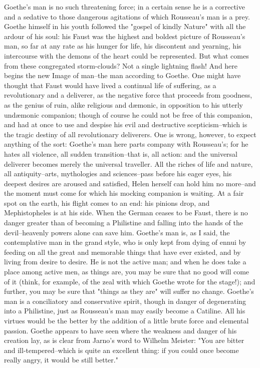 Goethe's man is no such threatening force; in a certain sense he is a
corrective and a sedative to those dangerous agitations of which
Rousseau's man is a prey. Goethe himself in his youth followed the
"gospel of kindly Nature" with all the ardour of his soul: his Faust
was the highest and boldest picture of Rousseau's man, so far at any
rate as his hunger for life, his discontent and yearning, his
intercourse with the demons of the heart could be represented. But
what comes from these congregated storm-clouds? Not a single
lightning flash! And here begins the new Image of man--the man
according to Goethe. One might have thought that Faust would have
lived a continual life of suffering, as a revolutionary and a
deliverer, as the negative force that proceeds from goodness, as the
genius of ruin, alike religious and dæmonic, in opposition to his
utterly undæmonic companion; though of course he could not be free of
this companion, and had at once to use and despise his evil and
destructive scepticism--which is the tragic destiny of all
revolutionary deliverers. One is wrong, however, to expect anything
of the sort: Goethe's man here parts company with Rousseau's; for he
hates all violence, all sudden transition--that is, all action: and
the universal deliverer becomes merely the universal traveller. All
the riches of life and nature, all antiquity--arts, mythologies and
sciences--pass before his eager eyes, his deepest desires are aroused
and satisfied, Helen herself can hold him no more--and the moment
must come for which his mocking companion is waiting. At a fair spot
on the earth, his flight comes to an end: his pinions drop, and
Mephistopheles is at his side. When the German ceases to be Faust,
there is no danger greater than of becoming a Philistine and falling
into the hands of the devil--heavenly powers alone can save him.
Goethe's man is, as I said, the contemplative man in the grand style,
who is only kept from dying of ennui by feeding on all the great and
memorable things that have ever existed, and by living from desire to
desire. He is not the active man; and when he does take a place among
active men, as things are, you may be sure that no good will come of
it (think, for example, of the zeal with which Goethe wrote for the
stage!); and further, you may be sure that "things as they are" will
suffer no change. Goethe's man is a conciliatory and conservative
spirit, though in danger of degenerating into a Philistine, just as
Rousseau's man may easily become a Catiline. All his virtues would be
the better by the addition of a little brute force and elemental
passion. Goethe appears to have seen where the weakness and danger of
his creation lay, as is clear from Jarno's word to Wilhelm Meister:
"You are bitter and ill-tempered--which is quite an excellent thing:
if you could once become really angry, it would be still better."

